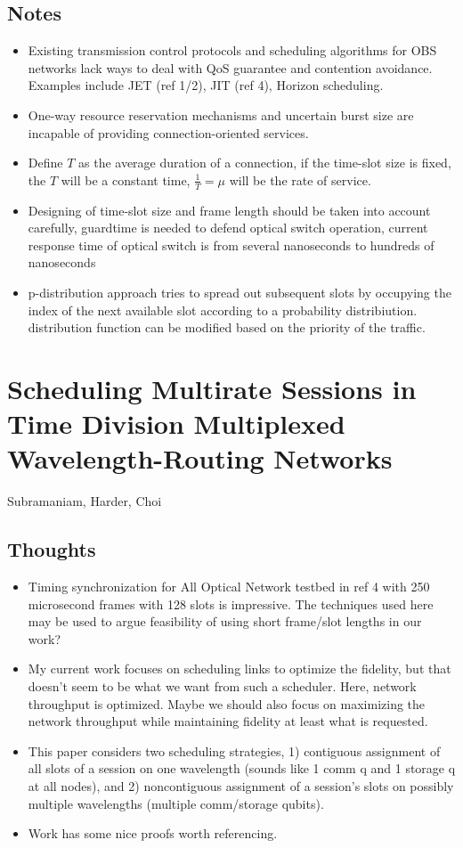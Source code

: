 \documentclass{article}
\begin{document}
\subsection{Notes}
\begin{itemize}
    \item Existing transmission control protocols and scheduling algorithms for OBS networks lack ways to deal with QoS guarantee and contention avoidance.  Examples include JET (ref 1/2), JIT (ref 4), Horizon scheduling.
    \item One-way resource reservation mechanisms and uncertain burst size are incapable of providing connection-oriented services.
    \item Define $T$ as the average duration of a connection, if the time-slot size is fixed, the $T$ will be a constant time, $\frac{1}{T}=\mu$ will be the rate of service.
    \item Designing of time-slot size and frame length should be taken into account carefully, guardtime is needed to defend optical switch operation, current response time of optical switch is from several nanoseconds to hundreds of nanoseconds
    \item p-distribution approach tries to spread out subsequent slots by occupying the index of the next available slot according to a probability distribiution.  distribution function can be modified based on the priority of the traffic.
\end{itemize}


\section{Scheduling Multirate Sessions in Time Division Multiplexed Wavelength-Routing Networks}
Subramaniam, Harder, Choi

\subsection{Thoughts}
\begin{itemize}
    \item Timing synchronization for All Optical Network testbed in ref 4 with 250 microsecond frames with 128 slots is impressive.  The techniques used here may be used to argue feasibility of using short frame/slot lengths in our work?
    \item My current work focuses on scheduling links to optimize the fidelity, but that doesn't seem to be what we want from such a scheduler.  Here, network throughput is optimized.  Maybe we should also focus on maximizing the network throughput while maintaining fidelity at least what is requested.
    \item This paper considers two scheduling strategies, 1) contiguous assignment of all slots of a session on one wavelength (sounds like 1 comm q  and 1 storage q at all nodes), and 2) noncontiguous assignment of a session's slots on possibly multiple wavelengths (multiple comm/storage qubits).
    \item Work has some nice proofs worth referencing.
\end{itemize}
\end{document}
